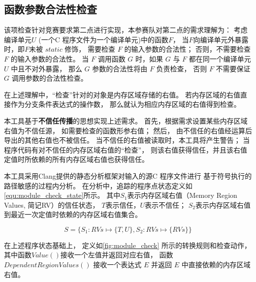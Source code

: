 \subsection{函数参数合法性检查}
\label{sec:core:arg}

该项检查针对竞赛要求第二点进行实现，本参赛队对第二点的需求理解为：
考虑编译单元$U$ (一个C 程序文件为一个编译单元)中的函数$F$，
当$F$向编译单元外暴露时，即$F$未被 $static$ 修饰，
需要检查 $F$ 的输入参数的合法性；
否则，不需要检查 $F$ 的输入参数的合法性。
当 $F$ 调用函数 $G$ 时，如果 $G$ 与 $F$ 都在同一个编译单元 $U$ 中且不对外暴露，
那么 $G$ 参数的合法性将由 $F$ 负责检查，
否则 $F$ 不需要保证 $G$ 调用参数的合法性检查。

在上述理解中，“检查”针对的对象是内存区域存储的右值。
若内存区域的右值直接作为分支条件表达式的操作数，
那么就认为相应内存区域的右值得到检查。

本工具基于{\bf 不信任传播}的思想实现上述需求。
首先，根据需求设置某些内存区域右值为不信任源，
如需要检查的函数形参右值；
然后，
由不信任的右值经运算后导出的其他右值也不被信任。
当不信任的右值被读取时，本工具将产生警告；
当程序代码有对不信任的内存区域右值的“检查”，
则该右值获得信任，并且该右值定值时所依赖的所有内存区域右值也获得信任。


本工具采用Clang提供的静态分析框架对输入的源C 程序文件进行
基于符号执行的路径敏感的过程内分析。
在分析中，追踪的程序点状态定义如\autoref{equ:module_check_state}所示。
其中$S_1$表示内存区域右值（Memory Region Values, 简记RV）的信任状态，
$T$表示信任，$U$表示不信任；
$S_2$表示内存区域右值到最近一次定值时依赖的内存区域右值集合。

\begin{equation}
\label{equ:module_check_state}
S = \{
S_1 : RVs \mapsto \{T, U\}, 
S_2 : RVs \mapsto \{RVs\}
\}
\end{equation}

在上述程序状态基础上，
定义如\autoref{fig:module_check} 所示的转换规则和检查动作，
其中函数$Value()$接收一个左值并返回对应右值，
函数 $DependentRegionValues()$ 接收一个表达式 $E$
并返回 $E$ 中直接依赖的内存区域右值。

